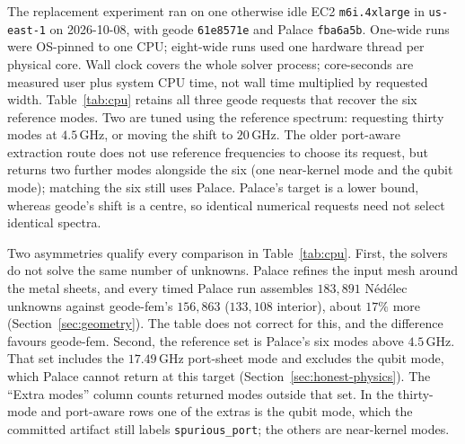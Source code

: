 \documentclass{anvil-paper}
\begin{document}
The replacement experiment ran on one otherwise idle EC2
\texttt{m6i.4xlarge} in \texttt{us-east-1} on 2026-10-08, with geode
\texttt{61e8571e} and Palace \texttt{fba6a5b}. One-wide runs were
OS-pinned to one CPU; eight-wide runs used one hardware thread per
physical core. Wall clock covers the whole solver process; core-seconds
are measured user plus system CPU time, not wall time multiplied by
requested width. Table~\ref{tab:cpu} retains all three geode requests
that recover the six reference modes. Two are tuned using the reference
spectrum: requesting thirty modes at $4.5$\,GHz, or moving the shift to
$20$\,GHz. The older port-aware extraction route does not use reference
frequencies to choose its request, but returns two further modes
alongside the six (one near-kernel mode and the qubit mode); matching
the six still uses Palace.
Palace's target is a lower bound, whereas geode's shift is a centre, so
identical numerical requests need not select identical spectra.

Two asymmetries qualify every comparison in Table~\ref{tab:cpu}. First,
the solvers do not solve the same number of unknowns. Palace refines
the input mesh around the metal sheets, and every timed Palace run
assembles $183{,}891$ N\'ed\'elec unknowns against geode-fem's
$156{,}863$ ($133{,}108$ interior), about $17\%$ more
(Section~\ref{sec:geometry}). The table does not correct for this, and
the difference favours geode-fem. Second, the reference set is Palace's
six modes above $4.5$\,GHz. That set includes the $17.49$\,GHz
port-sheet mode and excludes the qubit mode, which Palace cannot return
at this target (Section~\ref{sec:honest-physics}). The ``Extra modes''
column counts returned modes outside that set. In the thirty-mode and
port-aware rows one of the extras is the qubit mode, which the committed
artifact still labels \texttt{spurious\_port}; the others are
near-kernel modes.
\end{document}
